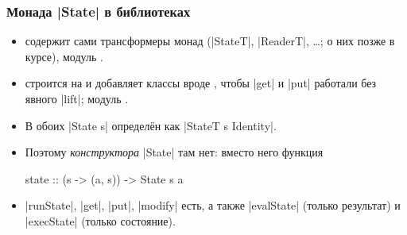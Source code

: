 \documentclass[11pt]{beamer}
\begin{document}
\begin{frame}[fragile]
  \frametitle{Монада \haskinline|State| в библиотеках}
  \begin{itemize}
    \item {} содержит сами трансформеры монад (\haskinline|StateT|, \haskinline|ReaderT|, \ldots; о них позже в курсе), модуль \href{https://hackage.haskell.org/package/transformers/docs/Control-Monad-Trans-State.html}{}.
    \item {} строится на  и добавляет классы вроде \href{https://hackage.haskell.org/package/mtl/docs/Control-Monad-State-Class.html#t:MonadState}{}, чтобы \haskinline|get| и \haskinline|put| работали без явного \haskinline|lift|; модуль \href{https://hackage.haskell.org/package/mtl/docs/Control-Monad-State.html}{}.
    \item В обоих \haskinline|State s| определён как \haskinline|StateT s Identity|.
    \item Поэтому \emph{конструктора} \haskinline|State| там нет: вместо него функция
          \begin{haskell}
            state :: (s -> (a, s)) -> State s a
          \end{haskell}
    \item \haskinline|runState|, \haskinline|get|, \haskinline|put|, \haskinline|modify| есть, а также \haskinline|evalState| (только результат) и \haskinline|execState| (только состояние).
  \end{itemize}
\end{frame}
\end{document}

